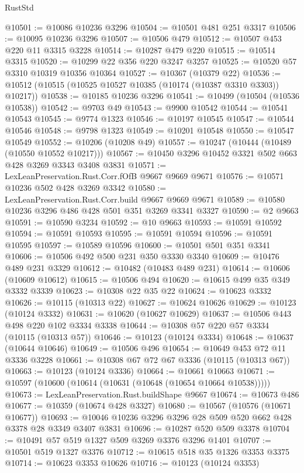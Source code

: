 \begin{lexlean}{RustStd}
\begin{coremodule}
@10501 := @10086 @10236 @3296
@10504 := @10501 @481 @251 @3317
@10506 := @10095 @10236 @3296
@10507 := @10506 @479
@10512 := @10507 @453 @220 @11 @3315 @3228
@10514 := @10287 @479 @220
@10515 := @10514 @3315
@10520 := @10299 @22 @356 @220 @3247 @3257
@10525 := @10520 @57 @3310 @10319 @10356 @10364
@10527 := @10367 (@10379 @22)
@10536 := @10512 (@10515 (@10525 @10527 @10385 (@10174 (@10387 @3310 @3303)) @10217))
@10538 := @10185 @10236 @3296
@10541 := @10499 (@10504 (@10536 @10538))
@10542 := @9703 @49
@10543 := @9900 @10542
@10544 := @10541 @10543
@10545 := @9774 @1323
@10546 := @10197 @10545
@10547 := @10544 @10546
@10548 := @9798 @1323
@10549 := @10201 @10548
@10550 := @10547 @10549
@10552 := @10206 (@10208 @49)
@10557 := @10247 (@10444 (@10489 (@10550 @10552 @10217)))
@10567 := @10450 @3296 @10452 @3321 @502 @663 @428 @3269 @3343 @3408 @3831
@10571 := LexLeanPreservation.Rust.Corr.fOfB @9667 @9669 @9671
@10576 := @10571 @10236 @502 @428 @3269 @3342
@10580 := LexLeanPreservation.Rust.Corr.build @9667 @9669 @9671
@10589 := @10580 @10236 @3296 @486 @428 @501 @351 @3269 @3341 @3327
@10590 := @2 @9663
@10591 := @10590 @3234
@10592 := @10 @9663
@10593 := @10591 @10592
@10594 := @10591 @10593
@10595 := @10591 @10594
@10596 := @10591 @10595
@10597 := @10589 @10596
@10600 := @10501 @501 @351 @3341
@10606 := @10506 @492 @500 @231 @350 @3330 @3340
@10609 := @10476 @489 @231 @3329
@10612 := @10482 (@10483 @489 @231)
@10614 := @10606 (@10609 @10612)
@10615 := @10506 @494
@10620 := @10615 @499 @35 @349 @3332 @3339
@10623 := @10308 @22 @35 @22
@10624 := @10623 @3332
@10626 := @10115 (@10313 @22)
@10627 := @10624 @10626
@10629 := @10123 (@10124 @3332)
@10631 := @10620 (@10627 @10629)
@10637 := @10506 @443 @498 @220 @102 @3334 @3338
@10644 := @10308 @57 @220 @57 @3334 (@10115 (@10313 @57))
@10646 := @10123 (@10124 @3334)
@10648 := @10637 (@10644 @10646)
@10649 := @10506 @496
@10654 := @10649 @453 @72 @11 @3336 @3228
@10661 := @10308 @67 @72 @67 @3336 (@10115 (@10313 @67))
@10663 := @10123 (@10124 @3336)
@10664 := @10661 @10663
@10671 := @10597 (@10600 (@10614 (@10631 (@10648 (@10654 @10664 @10538)))))
@10673 := LexLeanPreservation.Rust.buildShape @9667
@10674 := @10673 @486
@10677 := @10359 (@10674 @428 @3327)
@10680 := @10567 (@10576 (@10671 @10677))
@10693 := @10046 @10236 @3296 @3296 @28 @509 @520 @662 @428 @3378 @28 @3349 @3407 @3831
@10696 := @10287 @520 @509 @3378
@10704 := @10491 @57 @519 @1327 @509 @3269 @3376 @3296 @1401
@10707 := @10501 @519 @1327 @3376
@10712 := @10615 @518 @35 @1326 @3353 @3375
@10714 := @10623 @3353 @10626
@10716 := @10123 (@10124 @3353)

\end{coremodule}
\end{lexlean}
